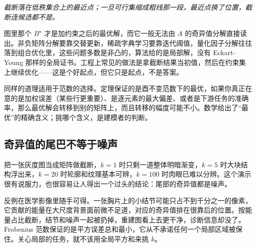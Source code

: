 \begin{center}
\end{center}

\emph{截断落在低秩集合上的最近点；一旦可行集缩成粗线那一段，最近点换了位置，截断连候选都不是。}

图里那个 \(B^\star\) 才是加约束之后的最优解，而它一般无法由 \(A\) 的奇异值分解直接读出。非负矩阵分解要靠交替更新，稀疏字典学习要靠迭代阈值，量化因子分解往往落到组合优化里，这些问题多数是非凸的，算法给的是局部解，没有 Eckart--Young 那样的全局证书。工程上常见的做法是拿截断结果当初值，然后在约束集上继续优化——这是个好起点，但它只是起点，不是答案。

同样的道理适用于范数的选择。定理保证的是酉不变范数下的最优，如果你真正在意的是加权误差（某些行更重要）、是逐元素的最大偏差、或者是下游任务的准确率，那么最优解会转移到别的矩阵上，而且转移的幅度可能不小。数学给出了``最优''的精确含义；挑哪个含义，是建模者的判断。

\subsection{奇异值的尾巴不等于噪声}

把一张灰度图当成矩阵做截断，\(k=1\) 时只剩一道整体明暗渐变，\(k=5\) 时大块结构浮出来，\(k=20\) 时轮廓和纹理基本可辨，\(k=100\) 时肉眼已难以分辨。这个演示很有说服力，也很容易让人得出一个过头的结论：尾部的奇异值都是噪声。

反例在医学影像里随手可得。一张胸片上的小结节可能只占不到千分之一的像素，它贡献的能量在大尺度背景面前微不足道，对应的奇异值排在很靠后的位置。按能量占比截断，结节和噪声一起被扔掉，重建图看上去更干净，诊断信息却没了。Frobenius 范数保证的是平方误差总和最小，它从不承诺任何一个局部区域被保住。关心局部的任务，就不该用全局平方和来挑 \(k\)。

